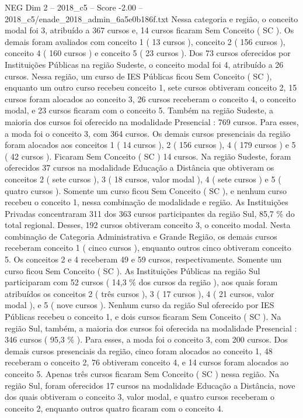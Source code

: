 \begin{textsample}{NEG Dim 2 – 2018\_c5 – Score -2.00 – 2018\_c5/enade\_2018\_admin\_6a5e0b186f.txt}
Nessa categoria e região, o conceito modal foi 3, atribuído a 367 cursos e, 14 cursos ficaram Sem Conceito ( SC ).
Os demais foram avaliados com conceito 1 ( 13 cursos ), conceito 2 ( 156 cursos ), conceito 4 ( 160 cursos ) e conceito 5 ( 23 cursos ).
Dos 73 cursos oferecidos por Instituições Públicas na região Sudeste, o conceito modal foi 4, atribuído a 26 cursos.
Nessa região, um curso de IES Públicas ficou Sem Conceito ( SC ), enquanto um outro curso recebeu conceito 1, sete cursos obtiveram conceito 2, 15 cursos foram alocados ao conceito 3, 26 cursos receberam o conceito 4, o conceito modal, e 23 cursos ficaram com o conceito 5.
Também na região Sudeste, a maioria dos cursos foi oferecido na modalidade Presencial : 769 cursos.
Para esses, a moda foi o conceito 3, com 364 cursos.
Os demais cursos presenciais da região foram alocados aos conceitos 1 ( 14 cursos ), 2 ( 156 cursos ), 4 ( 179 cursos ) e 5 ( 42 cursos ).
Ficaram Sem Conceito ( SC ) 14 cursos.
Na região Sudeste, foram oferecidos 37 cursos na modalidade Educação a Distância que obtiveram os conceitos 2 ( sete cursos ), 3 ( 18 cursos, valor modal ), 4 ( sete cursos ) e 5 ( quatro cursos ).
Somente um curso ficou Sem Conceito ( SC ), e nenhum curso recebeu o conceito 1, nessa combinação de modalidade e região.
As Instituições Privadas concentraram 311 dos 363 cursos participantes da região Sul, 85,7 \% do total regional.
Desses, 192 cursos obtiveram conceito 3, o conceito modal.
Nesta combinação de Categoria Administrativa e Grande Região, os demais cursos receberam conceito 1 ( cinco cursos ), enquanto outros cinco obtiveram conceito 5.
Os conceitos 2 e 4 receberam 49 e 59 cursos, respectivamente.
Somente um curso ficou Sem Conceito ( SC ).
As Instituições Públicas na região Sul participaram com 52 cursos ( 14,3 \% dos cursos da região ), aos quais foram atribuídos os conceitos 2 ( três cursos ), 3 ( 17 cursos ), 4 ( 21 cursos, valor modal ), e 5 ( nove cursos ).
Nenhum curso da região Sul oferecido por IES Públicas recebeu o conceito 1, e dois cursos ficaram Sem Conceito ( SC ).
Na região Sul, também, a maioria dos cursos foi oferecida na modalidade Presencial : 346 cursos ( 95,3 \% ).
Para esses, a moda foi o conceito 3, com 200 cursos.
Dos demais cursos presenciais da região, cinco foram alocados ao conceito 1, 48 receberam o conceito 2, 76 obtiveram conceito 4, e 14 cursos foram alocados ao conceito 5.
Apenas três cursos ficaram Sem Conceito ( SC ) nessa região.
Na região Sul, foram oferecidos 17 cursos na modalidade Educação a Distância, nove dos quais obtiveram o conceito 3, valor modal, e quatro cursos receberam o conceito 2, enquanto outros quatro ficaram com o conceito 4.

\end{textsample}
